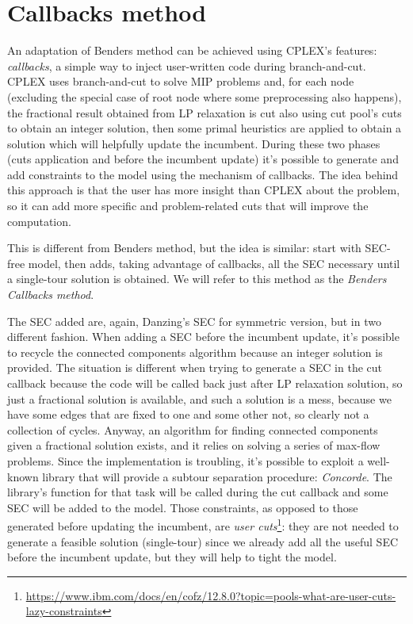 \section{Callbacks method}
An adaptation of Benders method can be achieved using CPLEX's features:
\emph{callbacks}, a simple way to inject user-written code during
branch-and-cut. CPLEX uses branch-and-cut to solve MIP problems and, for each
node (excluding the special case of root node where some preprocessing also
happens), the fractional result obtained from LP relaxation is cut also using
cut pool's cuts to obtain an integer solution, then some primal
heuristics are applied to obtain a solution which will helpfully update the
incumbent. During these two phases (cuts application and before the incumbent
update) it's possible to generate and add constraints to the model using the
mechanism of callbacks. The idea behind this approach is that the user has more
insight than CPLEX about the problem, so it can add more specific and
problem-related cuts that will improve the computation.

This is different from Benders method, but the idea is similar: start
with SEC-free model, then adds, taking advantage of callbacks, all the SEC
necessary until a single-tour solution is obtained. We will refer to this method
as the \emph{Benders Callbacks method}.

The SEC added are, again, Danzing's SEC for symmetric version, but in two
different fashion. When adding a SEC before the incumbent update, it's possible to
recycle the connected components algorithm because an integer solution is
provided. The situation is different when trying to generate a SEC in the cut
callback because the code will be called back just after LP relaxation
solution, so just a fractional solution is available, and such a solution is a
mess, because we have some edges that are fixed to one and some other not, so
clearly not a collection of cycles. Anyway, an algorithm for finding connected
components given a fractional solution exists, and it relies on solving a
series of max-flow problems. Since the implementation is troubling, it's
possible to exploit a well-known library that will provide a subtour separation
procedure: \emph{Concorde}. The library's function for that task will be called
during the cut callback and some SEC will be added to the model. Those
constraints, as opposed to those generated before updating the incumbent, are
\emph{user
cuts}\footnote{\href{https://www.ibm.com/docs/en/cofz/12.8.0?topic=pools-what-are-user-cuts-lazy-constraints}{https://www.ibm.com/docs/en/cofz/12.8.0?topic=pools-what-are-user-cuts-lazy-constraints}}:
they are not needed to generate a feasible solution (single-tour) since we
already add all the useful SEC before the incumbent update, but they will help to
tight the model.

